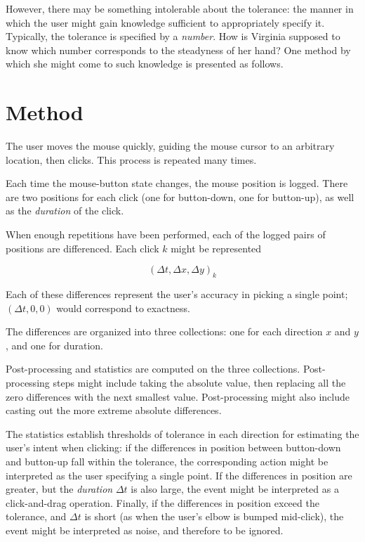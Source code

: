 \documentclass{article}
\begin{document}
However, there may be something intolerable about the tolerance:
the manner in which the user might gain knowledge sufficient to
appropriately specify it.
Typically, the tolerance is specified by a \emph{number}.
How is Virginia supposed to know which number corresponds to
the steadyness of her hand?
One method by which she might come to such knowledge is
presented as follows.

\section*{Method}

The user moves the mouse quickly, guiding the mouse cursor to an
arbitrary location, then clicks. This process is repeated many
times.

Each time the mouse-button state changes, the mouse position is
logged.
There are two positions for each click (one for button-down, one
for button-up), as well as the \emph{duration} of the click.

When enough repetitions have been performed, each of the logged
pairs of positions are differenced.
Each click $k$ might be represented

$$(\Delta t, \Delta x,  \Delta y)_k$$

Each of these differences represent the user's accuracy in
picking a single point;
$(\Delta t, 0, 0)$ would correspond to exactness.

The differences are organized into three collections: one for
each direction $x$ and $y$, and one for duration.

Post-processing and statistics are computed on the three
collections.
Post-processing steps might include taking the absolute value,
then replacing all the zero differences with the next smallest
value.
Post-processing might also include casting out the more extreme
absolute differences.

The statistics establish thresholds of tolerance in each
direction for estimating the user's intent when clicking: if the
differences in position between button-down and button-up fall
within the tolerance, the corresponding action might be
interpreted as the user specifying a single point.
If the differences in position are greater, but the
\emph{duration} $\Delta t$ is also large, the event might be
interpreted as a click-and-drag operation.
Finally, if the differences in position exceed the tolerance,
and $\Delta t$ is short (as when the user's elbow is bumped
mid-click), the event might be interpreted as noise, and
therefore to be ignored.
\end{document}
